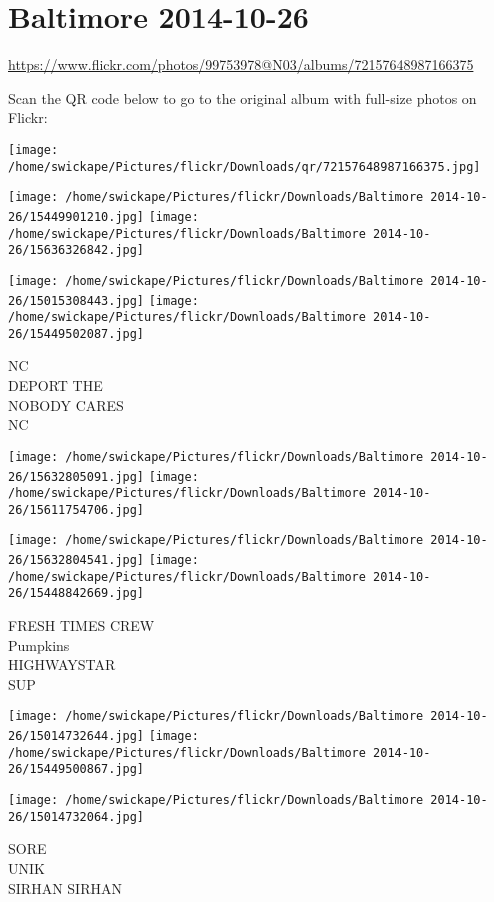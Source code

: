 \documentclass[10pt,letterpaper]{article}
\title{}
\author{}
\date{}
\begin{document}
\section*{Baltimore 2014-10-26}

\url{https://www.flickr.com/photos/99753978@N03/albums/72157648987166375}

Scan the QR code below to go to the original album with full-size photos on Flickr:

\texttt{[image: /home/swickape/Pictures/flickr/Downloads/qr/72157648987166375.jpg]}
\pagebreak

\texttt{[image: /home/swickape/Pictures/flickr/Downloads/Baltimore 2014-10-26/15449901210.jpg]}
\texttt{[image: /home/swickape/Pictures/flickr/Downloads/Baltimore 2014-10-26/15636326842.jpg]}

\texttt{[image: /home/swickape/Pictures/flickr/Downloads/Baltimore 2014-10-26/15015308443.jpg]}
\texttt{[image: /home/swickape/Pictures/flickr/Downloads/Baltimore 2014-10-26/15449502087.jpg]}

NC\\
DEPORT THE\\
NOBODY CARES\\
NC
\pagebreak

\texttt{[image: /home/swickape/Pictures/flickr/Downloads/Baltimore 2014-10-26/15632805091.jpg]}
\texttt{[image: /home/swickape/Pictures/flickr/Downloads/Baltimore 2014-10-26/15611754706.jpg]}

\texttt{[image: /home/swickape/Pictures/flickr/Downloads/Baltimore 2014-10-26/15632804541.jpg]}
\texttt{[image: /home/swickape/Pictures/flickr/Downloads/Baltimore 2014-10-26/15448842669.jpg]}

FRESH TIMES CREW\\
Pumpkins\\
HIGHWAYSTAR\\
SUP
\pagebreak

\texttt{[image: /home/swickape/Pictures/flickr/Downloads/Baltimore 2014-10-26/15014732644.jpg]}
\texttt{[image: /home/swickape/Pictures/flickr/Downloads/Baltimore 2014-10-26/15449500867.jpg]}

\texttt{[image: /home/swickape/Pictures/flickr/Downloads/Baltimore 2014-10-26/15014732064.jpg]}

SORE\\
UNIK\\
SIRHAN SIRHAN
\pagebreak
\end{document}
